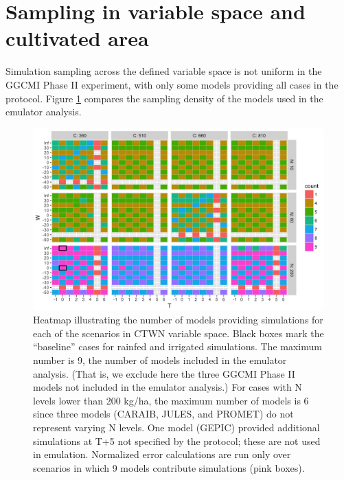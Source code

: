 \documentclass[12pt]{article}
\begin{document}
{\scriptsize \tableofcontents}

\clearpage

\renewcommand{\thefigure}{S\arabic{figure}}
\renewcommand{\thetable}{S\arabic{table}}

\section{Sampling in variable space and cultivated area}
\begin{justify}
	Simulation sampling across the defined variable space is not uniform in the GGCMI Phase II experiment, with only some models providing all cases in the protocol. 
  Figure \ref{fig:numbersims} compares the sampling density of the models used in the emulator analysis. 
\end{justify}

\begin{figure}[h!]
  \centering
  \includegraphics[width=\textwidth]{s_how_many_simulations.png}
  \caption{
  Heatmap illustrating the number of models providing simulations for each of the scenarios in CTWN variable space. Black boxes mark the ``baseline'' cases for rainfed and irrigated simulations.
	The maximum number is 9, the number of models included in the emulator analysis. (That is, we exclude here the three GGCMI Phase II models not included in the emulator analysis.)  For cases with N levels lower than 200 kg/ha, the maximum number of models is 6 since three models (CARAIB, JULES, and PROMET) do not represent varying N levels. One model (GEPIC) provided additional simulations at T+5 not specified by the protocol; these are not used in emulation.
  	Normalized error calculations are run only over scenarios in which 9 models contribute simulations (pink boxes).  }
  \label{fig:numbersims}
\end{figure}
\end{document}
